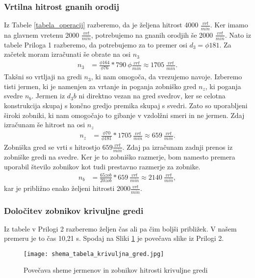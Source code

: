 \subsubsection{Vrtilna hitrost gnanih orodij}
Iz Tabele \ref{tabela_operacij} razberemo, da je željena hitrost 4000 \(\frac{vrt}{min}\).
Ker imamo na glavnem vretenu 2000 \(\frac{vrt}{min}\), potrebujemo na gnanih orodjih
še 2000 \(\frac{vrt}{min}\). Nato iz tabele Priloga 1
razberemo, da potrebujemo za to premer osi \(d_3 = \phi 181\). Za začetek moram izračunati še obrate na osi \(n_3\)
\begin{equation*}
	\begin{split}
		n_3 &= \frac{\phi 164}{\phi 76} * 790\ \phi \frac{vrt}{min} \approx 1705\ \frac{vrt}{min}.
	\end{split}
\end{equation*}
Takšni so vrtljaji na gredi \(n_3\), ki nam omogoča, da vrezujemo navoje.
Izberemo tisti jermen, ki je namenjen za vrtanje in poganja zobniško gred \(n_z\), ki
poganja svedre \(n_b\). Jermen iz \(d_3b\) ni direktno vezan na gred svedrov,
ker se celotna konstrukcija skupaj s končno gredjo premika skupaj s
svedri. Zato so uporabljeni široki zobniki, ki nam omogočajo to gibanje
v vzdolžni smeri in ne jermen. Zdaj izračunam še hitrost na osi \(n_z\)
\begin{equation*}
	\begin{split}
		n_z &= \frac{\phi 70}{\phi 181} * 1705\ \frac{vrt}{min} \approx 659\ \frac{vrt}{min}.
	\end{split}
\end{equation*}
Zobniška gred se vrti s hitrostjo \(659 \frac{vrt}{min}\). Zdaj pa izračunam
zadnji prenos iz zobniške gredi na svedre. Ker je to zobniško razmerje, bom namesto
premera uporabil število zobnikov kot tudi prestavno razmerje za zobnike.
\begin{equation*}
	\begin{split}
		n_b &= \frac{65 zob}{20 zob} * 659\ \frac{vrt}{min} \approx 2140\ \frac{vrt}{min},
	\end{split}
\end{equation*}
kar je približno enako željeni hitrosti \(2000\frac{vrt}{min}\).

\subsubsection{Določitev zobnikov krivuljne gredi}

Iz tabele v Prilogi 2 razberemo željen čas
ali pa čim boljši približek. V našem premeru je to čas 10,21 s.
Spodaj na Sliki \ref{povecava} je povečava slike iz Prilogi 2.
\begin{figure}[H]
	\begin{center}
		\texttt{[image: shema\_tabela\_krivuljna\_gred.jpg]}
		\caption{Povečava sheme jermenov in zobnikov
			hitrosti krivuljne gredi
			\cite{gauthier}}
		\label{povecava}
	\end{center}
\end{figure}

